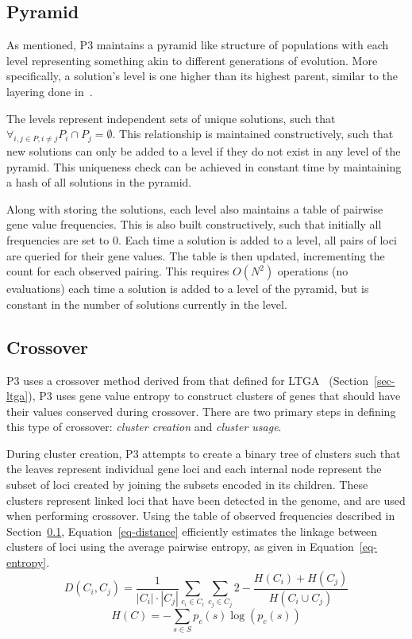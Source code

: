 \documentclass{sig-alternate}
\begin{document}
\subsection{Pyramid}
\label{sec-pyramid}
As mentioned, P3 maintains a pyramid like structure of populations
with each level representing something akin to different generations
of evolution. More specifically, a solution's level is one higher than
its highest parent, similar to the layering done
in~\cite{hornby:2006:alps}.

The levels represent independent sets of unique solutions, such that
$\forall_{i, j \in P, i \neq j} P_i \cap P_j = \emptyset$.  This relationship
is maintained constructively, such that new solutions can only be added to a level
if they do not exist in any level of the pyramid.  This uniqueness check can be
achieved in constant time by maintaining a hash of all solutions in the pyramid.

Along with storing the solutions, each level also maintains a table of pairwise
gene value frequencies.  This is also built constructively, such that initially
all frequencies are set to 0.  Each time a solution is added to a level, all
pairs of loci are queried for their gene values.  The table is then updated,
incrementing the count for each observed pairing.  This requires $O(N^2)$ operations
(no evaluations) each time a solution is added to a level of the pyramid, but is
constant in the number of solutions currently in the level.

\subsection{Crossover}
\label{sec-crossover}
P3 uses a crossover method derived from that defined for LTGA~\cite{thierens:2013:ltgahiff}
(Section~\ref{sec-ltga}),
P3 uses gene value entropy to construct clusters of genes that should have their values
conserved during crossover.  There are two primary steps in
defining this type of crossover: \emph{cluster creation} and \emph{cluster usage}.

During cluster creation, P3 attempts to create a binary tree of clusters such that the leaves
represent individual gene loci and each internal node represent the subset of loci created
by joining the subsets encoded in its children.  These clusters represent linked
loci that have been detected in the genome, and are used when performing crossover.
Using the table of observed frequencies described in Section~\ref{sec-pyramid}, Equation~\ref{eq-distance}
efficiently estimates the linkage between clusters of loci using the average pairwise
entropy, as given in Equation~\ref{eq-entropy}.
\begin{equation}
  D(C_i,C_j) = \frac{1}{\left | C_i \right |\cdot \left |C_j \right|}\sum_{c_i \in C_i}\sum_{c_j \in C_j} 
  2 - \frac{H(C_i) + H(C_j)}{H(C_i \cup C_j)}
  \label{eq-distance}
\end{equation}
\begin{equation}
  H(C) = -\sum_{s\in S} p_c(s)\log(p_c(s))
  \label{eq-entropy}
\end{equation}
\end{document}
